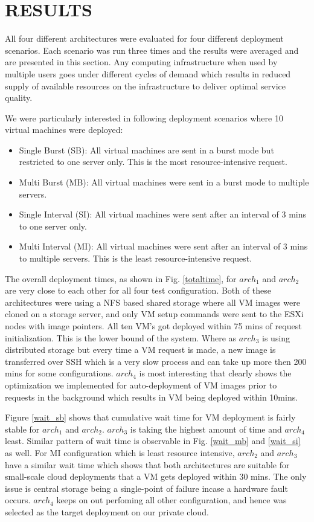 \documentclass[acus]{JAC2003}
\begin{document}
\section{RESULTS}

All four different architectures were evaluated for four different deployment scenarios. Each scenario was run three times and the results were averaged and are presented in this section. Any computing infrastructure when used by multiple users goes under different cycles of demand which results in reduced supply of available resources on the infrastructure to deliver optimal service quality.

We were particularly interested in following deployment scenarios where 10 virtual machines were deployed:
\begin {itemize}
\item Single Burst (SB): All virtual machines are sent in a burst mode but restricted to one server only. This is the most resource-intensive request.
\item Multi Burst (MB): All virtual machines were sent in a burst mode to multiple servers.
\item Single Interval (SI): All virtual machines were sent after an interval of 3 mins to one server only.
\item Multi Interval (MI): All virtual machines were sent after an interval of 3 mins to multiple servers. This is the least resource-intensive request.
\end{itemize}

The overall deployment times, as shown in Fig. \ref{totaltime}, for \textit{$arch_1$} and \textit{$arch_2$} are very close to each other for all four test configuration. Both of these architectures were using a NFS based shared storage where all VM images were cloned on a storage server, and only VM setup commands were sent to the ESXi nodes with image pointers. All ten VM's got deployed within 75 mins of request initialization. This is the lower bound of the system.  Where as \textit{$arch_3$} is using distributed storage but every time a VM request is made, a new image is transferred over SSH which is a very slow process and can take up more then 200 mins for some configurations. \textit{$arch_4$} is most interesting that clearly shows the optimization we implemented for auto-deployment of VM images prior to requests in the background which results in VM being deployed within 10mins.

Figure \ref{wait_sb} shows that cumulative wait time for VM deployment is fairly stable for \textit{$arch_1$} and \textit{$arch_2$}. \textit{$arch_3$} is taking the highest amount of time and \textit{$arch_4$} least. Similar pattern of wait time is observable in Fig. \ref{wait_mb} and \ref{wait_si} as well. For MI configuration which is least resource intensive, \textit{$arch_2$} and \textit{$arch_3$} have a similar wait time which shows that both architectures are suitable for small-scale cloud deployments that a VM gets deployed within 30 mins. The only issue is central storage being a single-point of failure incase a hardware fault occurs. \textit{$arch_4$} keeps on out perfoming all other configuration, and hence was selected as the target deployment on our private cloud.
\end{document}
